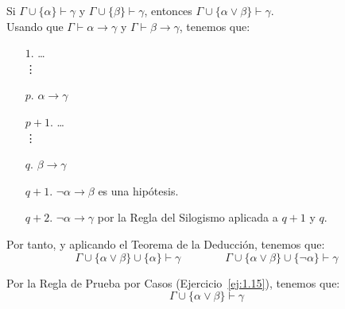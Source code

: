 \begin{ejercicio}\label{ej:1.25}
    Si $\Gamma \cup \{\alpha\} \vdash \gamma$ y $\Gamma \cup \{\beta\} \vdash \gamma$, entonces $\Gamma \cup \{\alpha \lor \beta\} \vdash \gamma$.\\

    Usando que $\Gamma\vdash \alpha\rightarrow\gamma$ y $\Gamma\vdash \beta\rightarrow\gamma$, tenemos que:
    \begin{enumerate}
        \item[$1$.] \ldots\\\vdots
        \item[$p$.] $\alpha\rightarrow\gamma$
        \item[$p+1$.] \ldots\\\vdots
        \item[$q$.] $\beta\rightarrow\gamma$
        \item[$q+1$.] $\neg\alpha\rightarrow\beta$ es una hipótesis.
        \item[$q+2$.] $\neg\alpha\rightarrow\gamma$ por la Regla del Silogismo aplicada a $q+1$ y $q$.
    \end{enumerate}

    Por tanto, y aplicando el Teorema de la Deducción, tenemos que:
    \begin{equation*}
        \Gamma \cup \{\alpha\lor \beta\} \cup \{\alpha\} \vdash \gamma\qquad\qquad \Gamma \cup \{\alpha\lor \beta\} \cup \{\neg\alpha\} \vdash \gamma
    \end{equation*}

    Por la Regla de Prueba por Casos (Ejercicio~\ref{ej:1.15}), tenemos que:
    \begin{equation*}
        \Gamma \cup \{\alpha\lor \beta\} \vdash \gamma
    \end{equation*}
\end{ejercicio}

